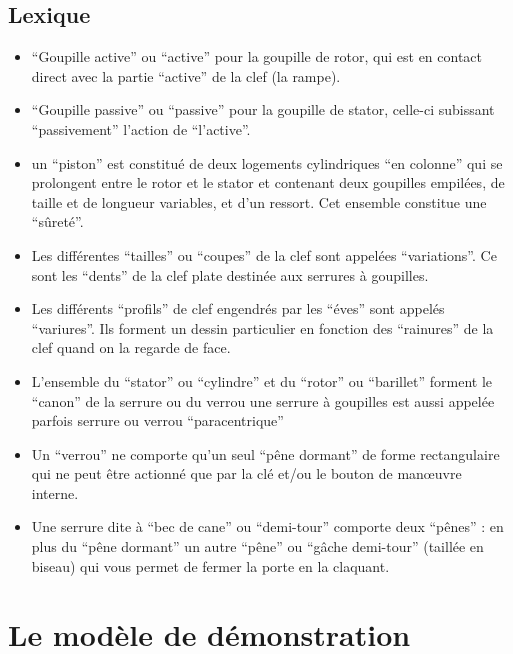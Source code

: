 \documentclass[a4paper,french,11pt,twoside]{report}
\begin{document}
\section*{Lexique}

\begin{itemize}
	\item{\enquote{Goupille active} ou \enquote{active} pour la goupille de rotor, qui est en contact direct avec la partie \enquote{active} de la clef (la rampe).}
	\item{\enquote{Goupille passive} ou \enquote{passive} pour la goupille de stator, celle-ci subissant \enquote{passivement} l'action de \enquote{l'active}.}
	\item{un \enquote{piston} est constitué de deux logements cylindriques \enquote{en colonne} qui se prolongent entre le rotor et le stator et contenant deux goupilles empilées, de taille et de longueur variables, et d'un ressort. Cet ensemble constitue une \enquote{sûreté}.}
	\item{Les différentes \enquote{tailles} ou \enquote{coupes} de la clef sont appelées \enquote{variations}. Ce sont les \enquote{dents} de la clef plate destinée aux serrures à goupilles.}
	\item{Les différents \enquote{profils} de clef engendrés par les \enquote{éves} sont appelés \enquote{variures}. Ils forment un dessin particulier en fonction des \enquote{rainures} de la clef quand on la regarde de face.}
	\item{L'ensemble du \enquote{stator} ou \enquote{cylindre} et du \enquote{rotor} ou \enquote{barillet} forment le \enquote{canon} de la serrure ou du verrou
une serrure à goupilles est aussi appelée parfois serrure ou verrou \enquote{paracentrique}}
	\item{Un \enquote{verrou} ne comporte qu'un seul \enquote{pêne dormant} de forme rectangulaire qui ne peut être actionné que par la clé et/ou le bouton de manœuvre interne.}
	\item{Une serrure dite à \enquote{bec de cane} ou \enquote{demi-tour} comporte deux \enquote{pênes} : en plus du \enquote{pêne dormant} un autre \enquote{pêne} ou \enquote{gâche demi-tour} (taillée en biseau) qui vous permet de fermer la porte en la claquant.}
\end{itemize}


\chapter{Le modèle de démonstration}
\end{document}
